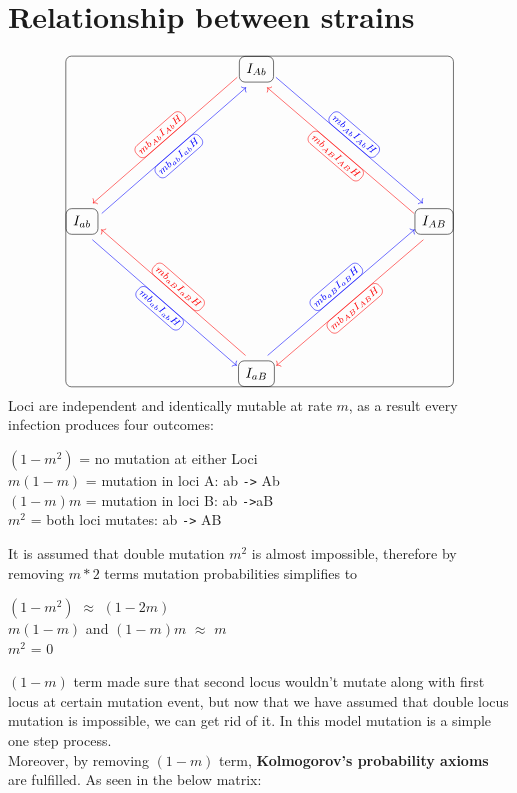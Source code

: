 \documentclass{report}
\begin{document}
\section{Relationship between strains}
\[
\begin{tikzcd}[
    row sep=9em, 
    column sep=10em, 
    nodes={draw, rounded corners, inner sep=5pt}
]
    & I_{Ab} 
      \arrow[dl, red, shift right=2, "mb_{Ab}I_{Ab}H" {sloped, above}'] 
      \arrow[dr, blue, shift left=2, "mb_{Ab}I_{Ab}H" {sloped, above}] 
    & \\
    I_{ab} 
      \arrow[ur, blue, shift right=2, "mb_{ab}I_{ab}H"{sloped, below}'] 
      \arrow[dr, blue, shift right=2, "mb_{ab}I_{ab}H"{sloped, below}'] 
    & &
    I_{AB} 
      \arrow[ul, red, shift left=2, "mb_{AB}I_{AB}H"{sloped, below}] 
      \arrow[dl, red, shift left=2, "mb_{AB}I_{AB}H"{sloped, below}] 
    \\
    &
    I_{aB}
      \arrow[ul, red, shift right=2, "mb_{aB}I_{aB}H"{sloped, above}'] 
      \arrow[ur, blue, shift left=2, "mb_{aB}I_{aB}H"{sloped, above}] 
    & 
\end{tikzcd}
\] 
Loci are independent and identically mutable at rate $m$, as a result every infection produces four outcomes:\\
\begin{center}
    $(1-m^2)$ = no mutation at either Loci\\
    $m(1-m)$ = mutation in loci A: ab  \verb|->| Ab\\
    $(1-m)m$ = mutation in loci B: ab \verb|->|aB\\
    $m^2$ = both loci mutates: ab \verb|->| AB\\
\end{center}
It is assumed that double mutation $m^2$ is almost impossible, therefore by removing $m*2$ terms mutation probabilities simplifies to
\begin{center}
    $(1-m^2)$ $\approx$ $(1-2m)$\\
    $m(1-m)$ and $(1-m)m$ $\approx$ $m$\\
    $m^2$ = 0
\end{center}
$(1-m)$ term made sure that second locus wouldn't mutate along with first locus at certain mutation event, but now that we have assumed that double locus mutation is impossible, we can get rid of it.
In this model mutation is a simple one step process. \\
Moreover, by removing $(1-m)$ term, \textbf{Kolmogorov's probability axioms} are fulfilled. As seen in the below matrix:
\end{document}
